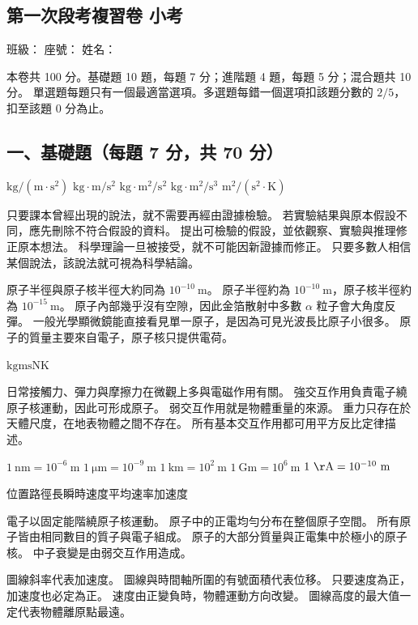 \documentclass[10pt,a4paper]{article}
\newcommand{\examheader}{
    \begin{center}
        \section*{第一次段考複習卷 小考}
    \end{center}
}
\newcommand{\examinfo}{
\noindent \hspace*{\fill} \large 班級：\underline{\hspace{1.5cm}} 座號：\underline{\hspace{1cm}} 姓名：\underline{\hspace{2.5cm}}
\vspace{0.8em}

\begin{tcolorbox}[colframe=black, colback=white, arc=2mm]
\small
本卷共 100 分。基礎題 10 題，每題 7 分；進階題 4 題，每題 5 分；混合題共 10 分。
單選題每題只有一個最適當選項。多選題每錯一個選項扣該題分數的 $2/5$，扣至該題 0 分為止。
\end{tcolorbox}
}
\begin{document}
\examheader
\examinfo

\subsection*{一、基礎題（每題 7 分，共 70 分）}

{$\mathrm{kg}/(\mathrm{m}\cdot\mathrm{s}^2)$}
{$\mathrm{kg}\cdot\mathrm{m}/\mathrm{s}^2$}
{$\mathrm{kg}\cdot\mathrm{m}^2/\mathrm{s}^2$}
{$\mathrm{kg}\cdot\mathrm{m}^2/\mathrm{s}^3$}
{$\mathrm{m}^2/(\mathrm{s}^2\cdot\mathrm{K})$}

{只要課本曾經出現的說法，就不需要再經由證據檢驗。}
{若實驗結果與原本假設不同，應先刪除不符合假設的資料。}
{提出可檢驗的假設，並依觀察、實驗與推理修正原本想法。}
{科學理論一旦被接受，就不可能因新證據而修正。}
{只要多數人相信某個說法，該說法就可視為科學結論。}

{原子半徑與原子核半徑大約同為 $10^{-10}\ \mathrm{m}$。}
{原子半徑約為 $10^{-10}\ \mathrm{m}$，原子核半徑約為 $10^{-15}\ \mathrm{m}$。}
{原子內部幾乎沒有空隙，因此金箔散射中多數 $\alpha$ 粒子會大角度反彈。}
{一般光學顯微鏡能直接看見單一原子，是因為可見光波長比原子小很多。}
{原子的質量主要來自電子，原子核只提供電荷。}

{$\mathrm{kg}$}{$\mathrm{m}$}{$\mathrm{s}$}{$\mathrm{N}$}{$\mathrm{K}$}

{日常接觸力、彈力與摩擦力在微觀上多與電磁作用有關。}
{強交互作用負責電子繞原子核運動，因此可形成原子。}
{弱交互作用就是物體重量的來源。}
{重力只存在於天體尺度，在地表物體之間不存在。}
{所有基本交互作用都可用平方反比定律描述。}

{$1\ \mathrm{nm}=10^{-6}\ \mathrm{m}$}
{$1\ \mathrm{\mu m}=10^{-9}\ \mathrm{m}$}
{$1\ \mathrm{km}=10^2\ \mathrm{m}$}
{$1\ \mathrm{Gm}=10^6\ \mathrm{m}$}
{$1\ \mathrm{\AA}=10^{-10}\ \mathrm{m}$}

{位置}{路徑長}{瞬時速度}{平均速率}{加速度}

{電子以固定能階繞原子核運動。}
{原子中的正電均勻分布在整個原子空間。}
{所有原子皆由相同數目的質子與電子組成。}
{原子的大部分質量與正電集中於極小的原子核。}
{中子衰變是由弱交互作用造成。}

{圖線斜率代表加速度。}
{圖線與時間軸所圍的有號面積代表位移。}
{只要速度為正，加速度也必定為正。}
{速度由正變負時，物體運動方向改變。}
{圖線高度的最大值一定代表物體離原點最遠。}
\end{document}
